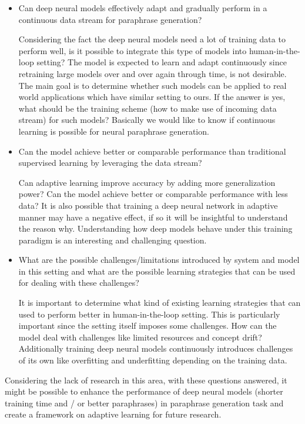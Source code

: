 \begin{itemize}
  \item Can deep neural models effectively adapt and gradually perform in a continuous data stream for paraphrase generation?

Considering the fact the deep neural models need a lot of training data to perform well, is it possible to integrate this type of models into human-in-the-loop setting? The model is expected to learn and adapt continuously since retraining large models over and over again through time, is not desirable. The main goal is to determine whether such models can be applied to real world applications which have similar setting to ours. If the answer is yes, what should be the training scheme (how to make use of incoming data stream) for such models? Basically we would like to know if continuous learning is possible for neural paraphrase generation. 
 
  \item Can the model achieve better or comparable performance than traditional supervised learning by leveraging the data stream?
  
  Can adaptive learning improve accuracy by adding more generalization power? Can the model achieve better or comparable performance with less data? It is also possible that training a deep neural network in adaptive manner may have a negative effect, if so it will be insightful to understand the reason why. Understanding how deep models behave under this training paradigm is an interesting and challenging question.
   
  \item What are the possible challenges/limitations introduced by system and model in this setting and what are the possible learning strategies that can be used for dealing with these challenges?
  
  It is important to determine what kind of existing learning strategies that can used to perform better in human-in-the-loop setting. This is particularly important since the setting itself imposes some challenges. How can the model deal with challenges like limited resources and concept drift? Additionally training deep neural models continuously introduces challenges of its own like overfitting and underfitting depending on the training data.

\end{itemize}

Considering the lack of research in this area, with these questions answered, it might be possible to enhance the performance of deep neural models (shorter training time and / or better paraphrases) in paraphrase generation task and create a framework on adaptive learning for future research.

